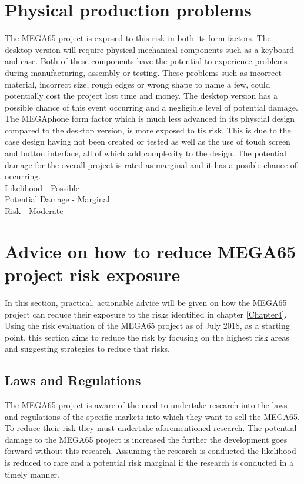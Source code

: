 \section{Physical production problems}
The MEGA65 project is exposed to this risk in both its form factors. The desktop version will require physical mechanical components such as a keyboard and case. Both of these components have the potential to experience problems during manufacturing, assembly or testing. These problems such as incorrect material, incorrect size, rough edges or wrong shape to name a few, could potentially cost the project lost time and money. The desktop version has a possible chance of this event occurring and a negligible level of potential damage. The MEGAphone form factor which is much less advanced in its physcial design compared to the desktop version, is more exposed to tis risk. This is due to the case design having not been created or tested as well as the use of touch screen and button interface, all of which add complexity to the design. The potential damage for the overall project is rated as marginal and it has a posible chance of occurring. \\ 

Likelihood - Possible \\
Potential Damage - Marginal \\
Risk - Moderate \\


\section{Advice on how to reduce MEGA65 project risk exposure}
In this section, practical, actionable advice will be given on how the MEGA65 project can reduce their exposure to the risks identified in chapter \ref{Chapter4}. Using the risk evaluation of the MEGA65 project as of July 2018, as a starting point, this section aims to reduce the risk by focusing on the highest risk areas and suggesting strategies to reduce that risks.

\subsection{Laws and Regulations}
The MEGA65 project is aware of the need to undertake research into the laws and regulations of the specific markets into which they want to sell the MEGA65. To reduce their risk they must undertake aforementioned research. The potential damage to the MEGA65 project is increased the further the development goes forward without this research. Assuming the research is conducted the likelihood is reduced to rare and a potential risk marginal if the research is conducted in a timely manner.

